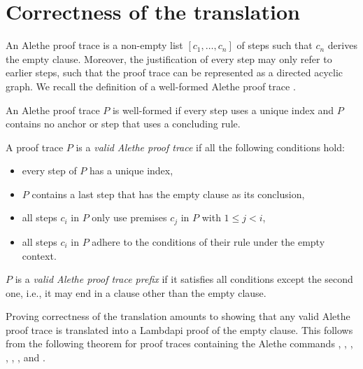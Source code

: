 \chapter{Correctness of the translation}\label{ch:soundness}

An Alethe proof trace is a non-empty list $[c_1, \dots, c_n]$ of steps such that $c_n$ derives the empty clause. Moreover, the justification of every step may only refer to earlier steps, such that the proof trace can be represented as a directed acyclic graph. We recall the definition of a well-formed Alethe proof trace \cite[Def.\ 7.2]{alethespec}.

\smallskip

\begin{definition}
An Alethe proof trace $P$ is well-formed if every step uses a unique index and $P$ contains no anchor or step that uses a concluding rule.
\end{definition}

\smallskip

\begin{definition} 
  A proof trace $P$ is a \emph{valid Alethe proof trace} if all the following conditions hold:
  \begin{itemize}
  \item every step of $P$ has a unique index,
  \item $P$ contains a last step that has the empty clause as its conclusion,
  \item all steps $c_i$ in $P$ only use premises $c_j$ in $P$ with $1 \leq j < i$,
  \item all steps $c_i$ in $P$ adhere to the conditions of their rule under the empty context.
  \end{itemize}
  $P$ is a \emph{valid Alethe proof trace prefix} if it satisfies all conditions except the second one, i.e., it may end in a clause other than the empty clause.
\end{definition}

\smallskip 

Proving correctness of the translation amounts to showing that any valid Alethe proof trace is translated into a Lambdapi proof of the empty clause. This follows from the following theorem for proof traces containing the Alethe commands , , , , , , and .

